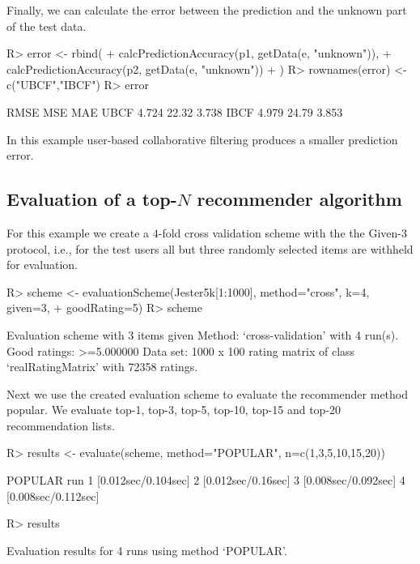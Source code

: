 \documentclass[nojss]{jss}
\begin{document}
Finally, we can calculate the error between the prediction and the
unknown part of the test data.

\begin{Schunk}
\begin{Sinput}
R> error <- rbind(
+   calcPredictionAccuracy(p1, getData(e, "unknown")),
+   calcPredictionAccuracy(p2, getData(e, "unknown"))
+ )
R> rownames(error) <- c("UBCF","IBCF")
R> error
\end{Sinput}
\begin{Soutput}
      RMSE   MSE   MAE
UBCF 4.724 22.32 3.738
IBCF 4.979 24.79 3.853
\end{Soutput}
\end{Schunk}

In this example user-based collaborative filtering produces a smaller
prediction error.

\subsection{Evaluation of a top-$N$ recommender algorithm}

For this example we create a $4$-fold cross validation scheme
with the the Given-3 protocol, i.e.,
for the test users all but three randomly selected items are withheld
for evaluation.

\begin{Schunk}
\begin{Sinput}
R> scheme <- evaluationScheme(Jester5k[1:1000], method="cross", k=4, given=3,
+     goodRating=5)
R> scheme
\end{Sinput}
\begin{Soutput}
Evaluation scheme with 3 items given
Method: ‘cross-validation’ with 4 run(s).
Good ratings: >=5.000000
Data set: 1000 x 100 rating matrix of class ‘realRatingMatrix’ with 72358 ratings.
\end{Soutput}
\end{Schunk}

Next we use the created evaluation scheme to evaluate the recommender
method popular.
We evaluate top-1, top-3, top-5, top-10, top-15 and top-20 recommendation lists.

\begin{Schunk}
\begin{Sinput}
R> results <- evaluate(scheme, method="POPULAR", n=c(1,3,5,10,15,20))
\end{Sinput}
\begin{Soutput}
POPULAR run
	 1  [0.012sec/0.104sec]
	 2  [0.012sec/0.16sec]
	 3  [0.008sec/0.092sec]
	 4  [0.008sec/0.112sec]
\end{Soutput}
\begin{Sinput}
R> results
\end{Sinput}
\begin{Soutput}
Evaluation results for 4 runs using method ‘POPULAR’.
\end{Soutput}
\end{Schunk}
\end{document}

